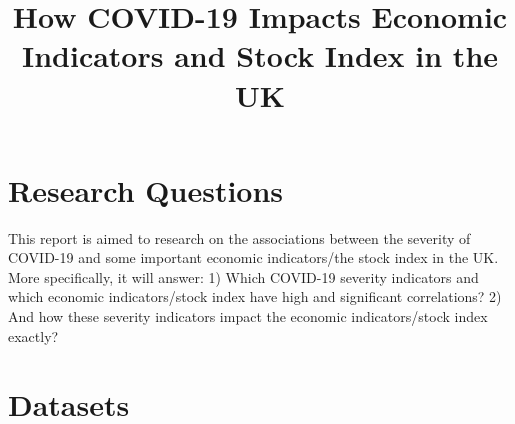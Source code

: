 \documentclass[12pt, a4paper]{report}
\title{How COVID-19 Impacts Economic Indicators and Stock Index in the UK}
\author{}
\date{}
\begin{document}
\maketitle

\section{Research Questions}
This report is aimed to research on the associations between the severity of COVID-19 and some important 
economic indicators/the stock index in the UK. More specifically, it will answer:
1) Which COVID-19 severity indicators and which economic indicators/stock index have high and significant correlations?
2) And how these severity indicators impact the economic indicators/stock index exactly?


\section{Datasets}
\end{document}
